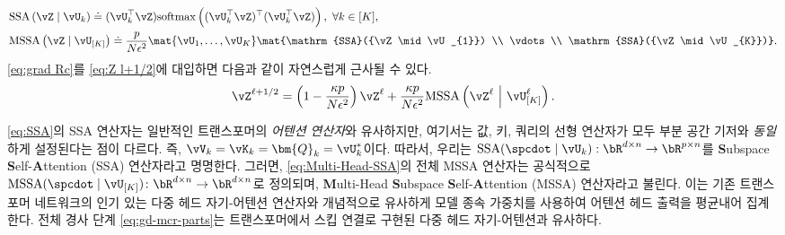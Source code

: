 \documentclass[../../book-main_ko.tex]{subfiles}
\begin{document}
\begin{align}
    & \mathrm{SSA}\left(\vZ \mid \vU_{k}\right) 
    \doteq (\vU_{k}^\top \vZ)\mathrm{softmax}\left((\vU_{k}^\top\vZ)^\top(\vU_{k}^\top\vZ)\right), \ \forall k \in [K], \label{eq:SSA} \\
    & \mathrm{MSSA}\left(\vZ \mid \vU_{[K]}\right) 
    \doteq \frac{p}{N\epsilon^2} \mat{\vU_{1}, \dots, \vU_{K}}\mat{\mathrm{SSA}({\vZ \mid \vU_{1}}) \\ \vdots \\ \mathrm{SSA}({\vZ \mid \vU_{K}})}.\label{eq:Multi-Head-SSA}
\end{align}  
\eqref{eq:grad Rc}를 \eqref{eq:Z l+1/2}에 대입하면 다음과 같이 자연스럽게 근사될 수 있다.
\begin{equation}
    \vZ^{\ell + 1/2} = \left(1 - \frac{\kappa p}{N\epsilon^2}\right) \vZ^{\ell} + \frac{\kappa p}{N\epsilon^2} \mathrm{MSSA}\left(\vZ^{\ell}\ \middle|\ \vU_{[K]}^{\ell}\right).  \label{eq:gd-mcr-parts} 
\end{equation}



\begin{remark}
    \eqref{eq:SSA}의 SSA 연산자는 일반적인 트랜스포머의 \textit{어텐션 연산자}와 유사하지만\citep{vaswani2017attention}, 여기서는 값, 키, 쿼리의 선형 연산자가 모두 부분 공간 기저와 \textit{동일}하게 설정된다는 점이 다르다. 즉, $\vV_{k} = \vK_{k} = \bm{Q}_{k} = \vU_k^*$이다. 따라서, 우리는 $\mathrm{SSA}({\spcdot\mid\vU_k}): \bR^{d\times n} \rightarrow \bR^{p\times n}$를 \textbf{S}ubspace \textbf{S}elf-\textbf{A}ttention (SSA) 연산자라고 명명한다. 그러면, \eqref{eq:Multi-Head-SSA}의 전체 MSSA 연산자는 공식적으로 \(\mathrm{MSSA}({\spcdot \mid \vU_{[K]}}) \colon \bR^{d \times n} \to \bR^{d \times n}\)로 정의되며, \textbf{M}ulti-Head \textbf{S}ubspace \textbf{S}elf-\textbf{A}ttention (MSSA) 연산자라고 불린다. 이는 기존 트랜스포머 네트워크의 인기 있는 다중 헤드 자기-어텐션 연산자와 개념적으로 유사하게 모델 종속 가중치를 사용하여 어텐션 헤드 출력을 평균내어 집계한다. 전체 경사 단계 \eqref{eq:gd-mcr-parts}는 트랜스포머에서 스킵 연결로 구현된 다중 헤드 자기-어텐션과 유사하다.
\end{remark}
\end{document}
